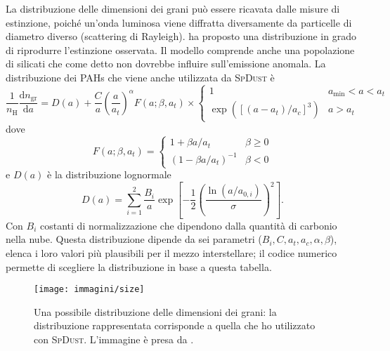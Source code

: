 La distribuzione delle dimensioni dei grani può essere ricavata dalle misure di estinzione, poiché un'onda luminosa viene diffratta diversamente da particelle di diametro diverso (scattering di Rayleigh). \textcite{WD01a} ha proposto una distribuzione in grado di riprodurre l'estinzione osservata. Il modello comprende anche una popolazione di silicati che come detto non dovrebbe influire sull'emissione anomala. La distribuzione dei PAHs che viene anche utilizzata da \textsc{SpDust} è
\begin{equation}
\label{graindist}
\frac{1}{n_{\mathrm{H}}} \frac{\mathrm{d}n_{\mathrm{gr}}}{\mathrm{d}a} = D(a) + \frac{C}{a} \left( \frac{a}{a_t} \right) ^\alpha F(a;\beta,a_t) \times
\begin{cases}
1 & a_{\mathrm{min}}<a<a_t\\
\exp \left([(a-a_t)/a_c]^3 \right) & a>a_t
\end{cases}
\end{equation}
dove
\begin{equation}
F(a;\beta,a_t) =
\begin{cases}
1+\beta a/a_t & \beta \geqslant 0\\
(1-\beta a/a_t)^{-1} & \beta < 0
\end{cases}
\end{equation}
e $D(a)$ è la distribuzione lognormale
\begin{equation}
D(a) = \sum_{i=1}^{2} \frac{B_i}{a} \exp \left[ - \frac{1}{2} \left( \frac{\ln(a/a_{0,i})}{\sigma} \right)^2 \right].
\end{equation}
Con $B_i$ costanti di normalizzazione che dipendono dalla quantità di carbonio nella nube. Questa distribuzione dipende da sei parametri ($B_i,C,a_t,a_c,\alpha,\beta$), \textcite[tabella 1]{WD01a} elenca i loro valori più plausibili per il mezzo interstellare; il codice numerico permette di scegliere la distribuzione in base a questa tabella.

\begin{figure}
\centering
\texttt{[image: immagini/size]}
\caption{Una possibile distribuzione delle dimensioni dei grani: la distribuzione rappresentata corrisponde a quella che ho utilizzato con \textsc{SpDust}. L'immagine è presa da \textcite{WD01a}. }
\label{fig:size}
\end{figure}


